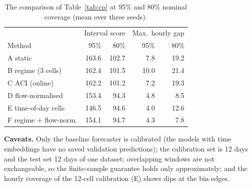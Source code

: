 \documentclass[conference]{IEEEtran}
\begin{document}
\begin{table}[t]
\centering\caption{The comparison of Table~\ref{tab:cp} at 95\% and 80\% nominal coverage (mean over three seeds).}\label{tab:cp2}
\footnotesize
\begin{tabular}{@{}lrrrr@{}}
\toprule
 & \multicolumn{2}{c}{Interval score} & \multicolumn{2}{c}{Max.\ hourly gap}\\
Method & 95\% & 80\% & 95\% & 80\%\\
\midrule
A static & 163.6 & 102.7 & 7.8 & 19.2\\
B regime (3 cells) & 162.4 & 101.5 & 10.0 & 21.4\\
C ACI (online) & 162.2 & 101.2 & 7.2 & 19.3\\
D flow-normalised & 153.4 & 94.3 & 4.8 & 8.5\\
E time-of-day cells & 146.5 & 94.6 & 4.0 & 12.6\\
F regime + flow-norm. & 154.1 & 94.7 & 4.3 & 7.8\\
\bottomrule
\end{tabular}
\end{table}

\textbf{Caveats.} Only the baseline forecaster is calibrated (the models with time embeddings have no saved validation predictions); the calibration set is 12 days and the test set 12 days of one dataset; overlapping windows are not exchangeable, so the finite-sample guarantee holds only approximately; and the hourly coverage of the 12-cell calibration (E) shows dips at the bin edges.
\end{document}
